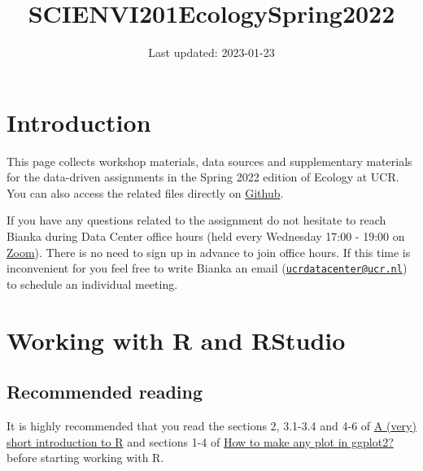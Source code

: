 \documentclass[
]{article}
\title{SCIENVI201EcologySpring2022}
\author{}
\date{\vspace{-2.5em}Last updated: 2023-01-23}
\begin{document}
\maketitle

{
\setcounter{tocdepth}{3}
\tableofcontents
}
\hfill\break

\hypertarget{introduction}{%
\section{Introduction}\label{introduction}}

This page collects workshop materials, data sources and supplementary
materials for the data-driven assignments in the Spring 2022 edition of
Ecology at UCR. You can also access the related files directly on
\href{https://github.com/ucrdatacenter/projects/tree/main/SCIENVI201/2022h1}{Github}.

If you have any questions related to the assignment do not hesitate to
reach Bianka during Data Center office hours (held every Wednesday 17:00
- 19:00 on
\href{https://universitycollegeroosevelt.zoom.us/j/2831128718?pwd=UmRuSzVqSTZyMndDbDRGSkV5VWFVQT09}{Zoom}).
There is no need to sign up in advance to join office hours. If this
time is inconvenient for you feel free to write Bianka an email
(\href{mailto:ucrdatacenter@ucr.nl}{\nolinkurl{ucrdatacenter@ucr.nl}})
to schedule an individual meeting.

\hfill\break

\hypertarget{working-with-r-and-rstudio}{%
\section{Working with R and RStudio}\label{working-with-r-and-rstudio}}

\hypertarget{recommended-reading}{%
\subsection{Recommended reading}\label{recommended-reading}}

It is highly recommended that you read the sections 2, 3.1-3.4 and 4-6
of
\href{https://github.com/ClaudiaBrauer/A-very-short-introduction-to-R/blob/master/documents/A\%20(very)\%20short\%20introduction\%20to\%20R.pdf}{A
(very) short introduction to R} and sections 1-4 of
\href{http://r-statistics.co/ggplot2-Tutorial-With-R.html\#6.1\%20Make\%20a\%20time\%20series\%20plot\%20(using\%20ggfortify)}{How
to make any plot in ggplot2?} before starting working with R.
\end{document}
